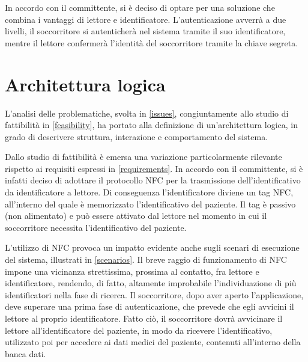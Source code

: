 \documentclass[a4paper,12pt]{report}
\begin{document}
In accordo con il committente, si è deciso di optare per una soluzione che combina i vantaggi di lettore e identificatore. L'autenticazione avverrà a due livelli, il soccorritore si autenticherà nel sistema tramite il suo identificatore, mentre il lettore confermerà l'identità del soccorritore tramite la chiave segreta.  

\section{Architettura logica} \label{logic_architecture}
L'analisi delle problematiche, svolta in \autoref{issues}, congiuntamente allo studio di fattibilità in \autoref{feasibility}, ha portato alla definizione di un'architettura logica, in grado di descrivere struttura, interazione e comportamento del sistema.

Dallo studio di fattibilità è emersa una variazione particolarmente rilevante rispetto ai requisiti espressi in \autoref{requirements}. In accordo con il committente, si è infatti deciso di adottare il protocollo NFC per la trasmissione dell'identificativo da identificatore a lettore. Di conseguenza l'identificatore diviene un tag NFC, all'interno del quale è memorizzato l'identificativo del paziente. Il tag è passivo (non alimentato) e può essere attivato dal lettore nel momento in cui il soccorritore necessita l'identificativo del paziente.

L'utilizzo di NFC provoca un impatto evidente anche sugli scenari di esecuzione del sistema, illustrati in \autoref{scenarios}. Il breve raggio di funzionamento di NFC impone una vicinanza strettissima, prossima al contatto, fra lettore e identificatore, rendendo, di fatto, altamente improbabile l'individuazione di più identificatori nella fase di ricerca. Il soccorritore, dopo aver aperto l'applicazione, deve superare una prima fase di autenticazione, che prevede che egli avvicini il lettore al proprio identificatore. Fatto ciò, il soccorritore dovrà avvicinare il lettore all'identificatore del paziente, in modo da ricevere l'identificativo, utilizzato poi per accedere ai dati medici del paziente, contenuti all'interno della banca dati. 
\end{document}
